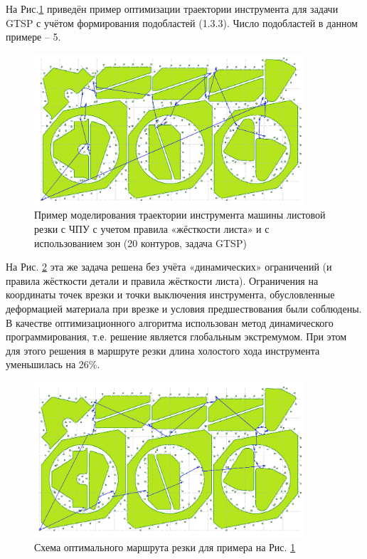 \documentclass[12pt,twoside]{report}
\begin{document}
На Рис.\ref{zones-a}
приведён пример оптимизации траектории
инструмента для задачи GTSP с учётом
формирования подобластей  (1.3.3).
Число подобластей в данном примере – 5.

\begin{figure}
  \begin{center}
  \includegraphics[width=0.9\textwidth]{zones-a.png}
  \caption{Пример моделирования траектории инструмента машины листовой резки с ЧПУ
    с учетом правила «жёсткости листа» и с использованием зон (20 контуров, задача GTSP)}
  \label{zones-a}
  \end{center}
\end{figure}

На Рис. \ref{zones-b}
эта же задача решена без учёта
«динамических» ограничений
(и правила жёсткости детали и правила жёсткости листа).
Ограничения на координаты точек врезки и
точки выключения инструмента,
обусловленные деформацией материала при врезке и
условия предшествования были соблюдены.
В качестве оптимизационного алгоритма
использован метод динамического программирования,
т.е. решение является глобальным экстремумом.
При этом для этого решения в маршруте резки
длина холостого хода инструмента уменьшилась на 26\%.

\begin{figure}
  \begin{center}
  \includegraphics[width=0.9\textwidth]{zones-b.png}
  \caption{Схема оптимального маршрута резки для примера на Рис. \ref{zones-a}}
  \label{zones-b}
  \end{center}
\end{figure}
\end{document}
